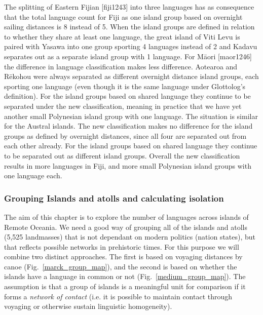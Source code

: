\documentclass[a4paper,10pt]{article} %
\begin{document}
The splitting of Eastern Fijian [fiji1243] into three languages has as consequence that the total language count for Fiji as one island group based on overnight sailing distances is 8 instead of 5. When the island groups are defined in relation to whether they share at least one language, the great island of Viti Levu is paired with Yasawa into one group sporting 4 languages instead of 2 and Kadavu separates out as a separate island group with 1 language. For M\={a}ori [maor1246] the difference in language classification makes less difference. Aotearoa and  R\={e}kohou were always separated as different overnight distance island groups, each sporting one language (even though it is the same language under Glottolog's definition). For the island groups based on shared language they continue to be separated under the new classification, meaning in practice that we have yet another small Polynesian island group with one language. The situation is similar for the Austral islands. The new classification makes no difference for the island groups as defined by overnight distances, since all four are separated out from each other already. For the island groups based on shared language they continue to be separated out as different island groups. Overall the new classification results in more languages in Fiji, and more small Polynesian island groups with one language each.

\subsubsection{Grouping Islands and atolls and calculating isolation}
\label{sec:island_geo}


The aim of this chapter is to explore the number of languages across islands of Remote Oceania. We need a good way of grouping all of the islands and atolls (5,525 landmasses) that is not dependant on modern politics (nation states), but that reflects possible networks in prehistoric times. For this purpose we will combine two distinct approaches. The first is based on voyaging distances by canoe (Fig.~\ref{marck_group_map}), and the second is based on whether the islands have a language in common or not (Fig.~\ref{medium_group_map}). The assumption is that a group of islands is a meaningful unit for comparison if it forms a \textit{network of contact} (i.e. it is possible to maintain contact through voyaging or otherwise sustain linguistic homogeneity). 
\end{document}
